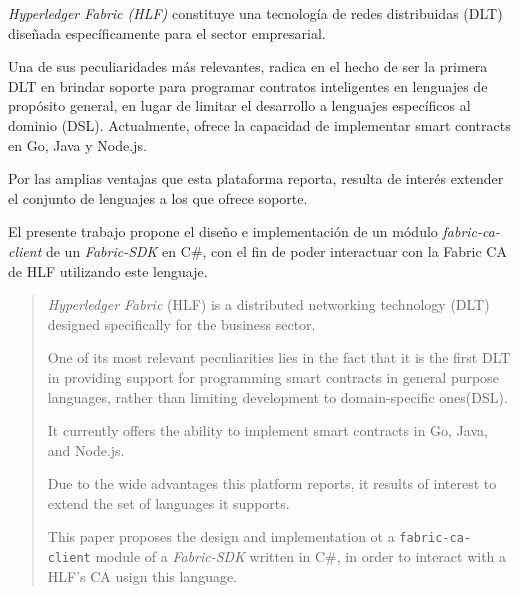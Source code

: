 \begin{resumen}
\emph{Hyperledger Fabric (HLF)} constituye una tecnolog\'ia de redes distribuidas (DLT) dise\~nada espec\'ificamente para el sector empresarial. 

Una de sus peculiaridades m\'as relevantes, radica en el hecho de ser la primera DLT en brindar soporte para programar contratos inteligentes en lenguajes de prop\'osito general, en lugar de limitar el desarrollo a lenguajes espec\'ificos al dominio (DSL). Actualmente, ofrece la capacidad de implementar smart contracts en Go, Java y Node.js.

Por las amplias ventajas que esta plataforma reporta, resulta de inter\'es extender el conjunto de lenguajes a los que ofrece soporte.

El presente trabajo propone el diseño e implementaci\'on de un m\'odulo \emph{fabric-ca-client} de un \emph{Fabric-SDK} en C\#, con el fin de poder interactuar con la Fabric CA de HLF utilizando este lenguaje. 
\end{resumen}

\begin{abstract}
	\emph{Hyperledger Fabric} (HLF) is a distributed networking technology (DLT)
	designed specifically for the business sector.
	
	One of its most relevant peculiarities lies in the fact that it is the first DLT
	in providing support for programming smart contracts in general purpose languages, rather than limiting development to domain-specific ones(DSL).
	
	It currently offers the ability to implement smart contracts in Go, Java, and Node.js.
	
	Due to the wide advantages this platform reports, it results of interest to extend the set of languages it supports.
	
	This paper proposes the design and implementation ot a \texttt{fabric-ca-client} module of a \emph{Fabric-SDK} written in C\#, in order to interact with a HLF's CA usign this language.
\end{abstract}

